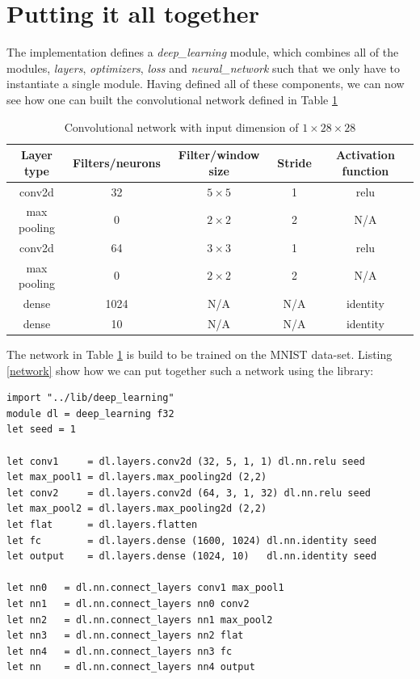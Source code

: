\section{Putting it all together}
The implementation defines a \emph{deep\_learning} module, which combines all of
the modules, \emph{layers}, \emph{optimizers}, \emph{loss} and
\emph{neural\_network} such that we only have to instantiate a single module. 
Having defined all of these components, we can now see how one can built the
convolutional network defined in Table \ref{table:conv2}  
\begin{table}[!htbp]
	\centering
	\begin{tabular}{|c|c|c|c|c|} \hline
		\textbf{Layer type} & \textbf{Filters/neurons} & \textbf{Filter/window size} &
		\textbf{Stride} & \textbf{Activation function} \\ \hline \hline 
		conv2d & 32 &  $5\times5$ & 1 & relu \\ \hline
		max pooling & 0 & $2\times2$ & 2 & N/A \\ \hline
		conv2d & 64 & $3\times3$ & 1 & relu \\ \hline
		max pooling & 0 & $2\times2$  & 2 & N/A \\ \hline
		dense & 1024  & N/A & N/A & identity \\ \hline
		dense & 10  & N/A & N/A & identity \\ \hline
	\end{tabular}
	\caption{Convolutional network with input dimension of $1 \times 28 \times 28$}
	\label{table:conv2}
\end{table}\newline 
The network in Table \ref{table:conv2} is build to be trained on the MNIST
data-set.
Listing \ref{network} show how we can put together such a network using the
library:
\begin{lstlisting}[language=futhark, caption = {Example of building a
convolutional network w. the library}, label = {network}]
import "../lib/deep_learning"
module dl = deep_learning f32
let seed = 1

let conv1     = dl.layers.conv2d (32, 5, 1, 1) dl.nn.relu seed
let max_pool1 = dl.layers.max_pooling2d (2,2)
let conv2     = dl.layers.conv2d (64, 3, 1, 32) dl.nn.relu seed
let max_pool2 = dl.layers.max_pooling2d (2,2)
let flat      = dl.layers.flatten
let fc        = dl.layers.dense (1600, 1024) dl.nn.identity seed
let output    = dl.layers.dense (1024, 10)   dl.nn.identity seed

let nn0   = dl.nn.connect_layers conv1 max_pool1
let nn1   = dl.nn.connect_layers nn0 conv2
let nn2   = dl.nn.connect_layers nn1 max_pool2
let nn3   = dl.nn.connect_layers nn2 flat
let nn4   = dl.nn.connect_layers nn3 fc
let nn    = dl.nn.connect_layers nn4 output
\end{lstlisting}
